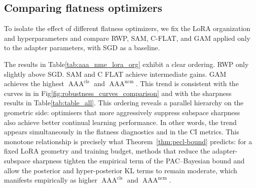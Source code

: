 \documentclass{article}
\theoremstyle{plain}
\theoremstyle{definition}
\theoremstyle{remark}
\begin{document}
\subsection{Comparing flatness optimizers}
\label{sec:results-optimizers}




To isolate the effect of different flatness optimizers, we fix the LoRA organization and hyperparameters and compare RWP, SAM, C-FLAT, and GAM applied only to the adapter parameters, with SGD as a baseline. 



The results in Table\ref{tab:aaa_nme_lora_org} exhibit a clear ordering. 
RWP only slightly above  SGD. 
SAM and C FLAT achieve intermediate gains. 
GAM achieves the highest $\operatorname{AAA}^{\mathrm{cls}}$ and $\operatorname{AAA}^{\mathrm{ncm}}$. 
This trend is consistent with the curves in in Fig\ref{fig:robustness_curves_comparison}  and with the sharpness results in Table\ref{tab:table_all}.
This ordering reveals a parallel hierarchy on the geometric side: optimisers that more aggressively suppress subspace sharpness also achieve better continual learning performance. In other words, the trend appears simultaneously in the flatness diagnostics and in the CI metrics. This monotone relationship is precisely what Theorem~\ref{thm:pecl-bound} predicts: for a fixed LoRA geometry and training budget, methods that reduce the adapter-subspace sharpness tighten the empirical term of the PAC–Bayesian bound and allow the posterior and hyper-posterior KL terms to remain moderate, which manifests empirically as higher $\operatorname{AAA}^{\mathrm{cls}}$ and $\operatorname{AAA}^{\mathrm{ncm}}$.
\end{document}
